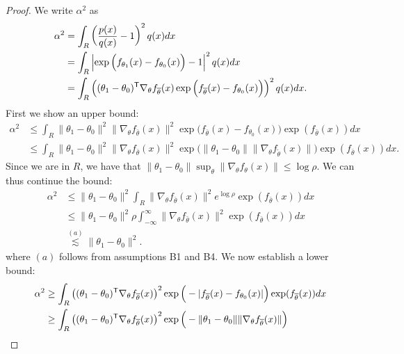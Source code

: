 \documentclass{article}
\begin{document}
\begin{proof}
We write $\alpha^2$ as
\begin{align*}
\alpha^2 &= \int_R \left( \frac{p(x)}{q(x)} - 1 \right)^2 q(x) dx \\
 &= \int_{R} \left| \exp\Big( f_{\theta_1}(x) - f_{\theta_0}(x) \Big) - 1 \right| ^2
            q(x )dx \\
 &= \int_{R} \left( (\theta_1 - \theta_0)^{\mathsf{T}} \nabla_{\theta} f_{\overline{\theta}}(x) 
                            \exp\Big( f_{\overline{\theta}}(x) - f_{\theta_0}(x) \Big) \right)^2 q(x)dx. 
\end{align*}
First we show an upper bound:
\begin{align*}
\alpha^2 & \leq \int_{R} \| \theta_1 - \theta_0 \|^2 \| \nabla_{\theta} f_{\bar{\theta}}(x)\|^2
                            \exp\Big( f_{\bar{\theta}}(x) - f_{\theta_0}(x) \Big)
              \exp( f_{\bar{\theta}}(x) ) dx\\
& \leq  \int_{R} \| \theta_1 - \theta_0 \|^2 \| \nabla_{\theta} f_{\bar{\theta}}(x)\|^2
                            \exp\Big( \| \theta_1 - \theta_0\| \|\nabla_{\theta} f_{\tilde{\theta}}(x) \| \Big) 
              \exp( f_{\bar{\theta}}(x) ) dx.
\end{align*}
Since we are in $R$, we have that $\| \theta_1 - \theta_0\| \sup_\theta \| \nabla_\theta f_{\theta}(x) \| \leq \log \rho$. We can thus continue the bound:
\begin{align*}
\alpha^2 & \leq   \| \theta_1 - \theta_0 \|^2 \int_{R} \| \nabla_{\theta} f_{\bar{\theta}}(x)\|^2
                           e^{\log \rho}
              \exp( f_{\bar{\theta}}(x) ) dx\\
& \leq  \| \theta_1 - \theta_0 \|^2 \rho \int_{-\infty}^\infty \| \nabla_{\theta} f_{\bar{\theta}}(x)\|^2
              \exp( f_{\bar{\theta}}(x) ) dx \\
& \stackrel{(a)}\lesssim \| \theta_1 - \theta_0 \|^2.
\end{align*}
where $(a)$ follows from assumptions B1 and B4. We now establish a lower bound:
\begin{align*}
\alpha^2 &\geq  \int_{R} \left( (\theta_1 - \theta_0)^\tran \nabla_{\theta} f_{\bar{\theta}}(x) \right)^2
                            \exp\Big( - |f_{\bar{\theta}}(x) - f_{\theta_0}(x)| \Big)  \exp(f_{\bar{\theta}}(x))
             dx \\
  &\geq \int_{R} \left( (\theta_1 - \theta_0)^\tran \nabla_{\theta} f_{\bar{\theta}}(x) \right)^2
                            \exp\Big( - \|\theta_1 - \theta_0\| \| \nabla_{\theta} f_{\bar{\theta}}(x) \| \Big)  

\end{align*}
\end{proof}
\end{document}
